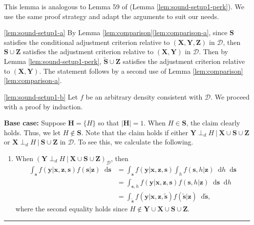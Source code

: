 \documentclass[twoside]{article}
\newcommand\given[1][]{\:#1\vert\:}
\newcommand{\mb}[1]{\mathbf{#1}}
\newcommand{\dsepp}{\perp_{d}}
\newcommand{\g}[1][G]{\mathcal{#1}}
\newcommand*\diff{\mathop{}\!\mathrm{d}}
\newenvironment{proofof}[1][]{\begin{trivlist}
\item[\hskip \labelsep {\bfseries Proof of #1.}]}{\hfill\BlackBox\end{trivlist}}
\newcommand{\BlackBox}{\rule{1.5ex}{1.5ex}}
\begin{document}
\begin{proofof}[Lemma \ref{lem:sound-setup1}] 
    This lemma is analogous to Lemma 59 of \cite{perkovic2018complete} (Lemma \ref{lem:sound-setup1-perk}). We use the same proof strategy and adapt the arguments to suit our needs.
    
    \ref{lem:sound-setup1-a} 
    By Lemma \ref{lem:comparison}\ref{lem:comparison-a}, since $\mb{S}$ satisfies the conditional adjustment criterion relative to $(\mb{X,Y,Z})$ in $\g[D]$, then $\mb{S} \cup \mb{Z}$ satisfies the adjustment criterion relative to $(\mb{X}, \mb{Y})$ in $\g[D]$. Then by Lemma \ref{lem:sound-setup1-perk}, $\mb{\tilde{S}} \cup \mb{Z}$ satisfies the adjustment criterion relative to $(\mb{X}, \mb{Y})$. The statement follows by a second use of Lemma \ref{lem:comparison}\ref{lem:comparison-a}.

    \ref{lem:sound-setup1-b} Let $f$ be an arbitrary density consistent with $\g[D]$. We proceed with a proof by induction.


    \textbf{Base case:} Suppose $\mb{H} = \{H\}$ so that $|\mb{H}|=1$. When $H \in \mb{S}$, the claim clearly holds. Thus, we let $H \notin \mb{S}$. Note that the claim holds if either $\mb{Y} \dsepp H \given \mb{X} \cup \mb{S} \cup \mb{Z}$ or $\mb{X} \dsepp H \given \mb{S} \cup \mb{Z}$ in $\g[D]$. To see this, we calculate the following.    
    \begin{enumerate}[label=\emph{(\alph*)}]
        \item \label{pf:sound-setup1-a}
        When $(\mb{Y} \dsepp H \given \mb{X} \cup \mb{S} \cup \mb{Z})_{\g[D]}$, then
        \begin{align}
            \int_\mb{s} f(\mb{y} | \mb{x,z,s})f(\mb{s} | \mb{z}) \diff \mb{s} 
                &= \int_\mb{s} f(\mb{y} | \mb{x,z,s})\int_{h}f(\mb{s},h | \mb{z}) \diff h \diff \mb{s} \nonumber \\
                &= \int_{\mb{s},h} f(\mb{y} | \mb{x,z,s}) f(\mb{s},h | \mb{z}) \diff \mb{s} \diff h  \nonumber \\
                &= \int_{\mb{\tilde{s}}} f(\mb{y} | \mb{x,z,\tilde{s}})f(\mb{\tilde{s}} | \mb{z}) \diff \mb{\tilde{s}}, \nonumber 
        \end{align}
        where the second equality holds since $H \notin \mb{Y} \cup \mb{X} \cup \mb{S} \cup \mb{Z}$.
    

\end{enumerate}
\end{proofof}
\end{document}
